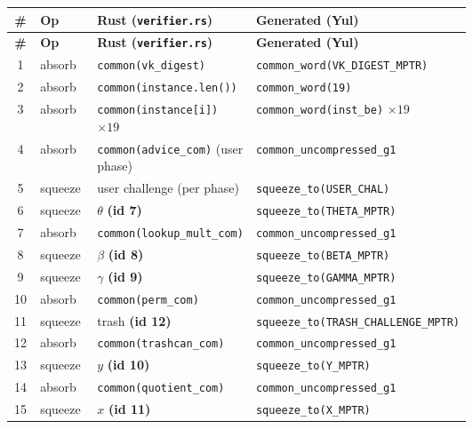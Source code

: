 \begin{small}
\begin{longtable}{@{}clp{0.30\linewidth}p{0.30\linewidth}@{}}
\toprule
\textbf{\#} & \textbf{Op} & \textbf{Rust (\texttt{verifier.rs})} & \textbf{Generated (Yul)} \\
\midrule
\endfirsthead
\toprule
\textbf{\#} & \textbf{Op} & \textbf{Rust (\texttt{verifier.rs})} & \textbf{Generated (Yul)} \\
\midrule
\endhead
1 & absorb & \texttt{common(vk\_\allowbreak{}digest)} & \texttt{common\_word\allowbreak(VK\_DIGEST\_MPTR)} \\
2 & absorb & \texttt{common(instance.len())} & \texttt{common\_word(19)} \\
3 & absorb & \texttt{common(instance[i])} $\times 19$ & \texttt{common\_\allowbreak{}word(inst\_\allowbreak{}be)} $\times 19$ \\
4 & absorb & \texttt{common(advice\_\allowbreak{}com)} (user phase) & \texttt{common\_\allowbreak{}uncompressed\_\allowbreak{}g1} \\
5 & squeeze & user challenge (per phase) & \texttt{squeeze\_\allowbreak{}to(USER\_\allowbreak{}CHAL)} \\
6 & squeeze & $\theta$ \textbf{(id 7)} & \texttt{squeeze\_\allowbreak{}to(THETA\_\allowbreak{}MPTR)} \\
7 & absorb & \texttt{common(lookup\_\allowbreak{}mult\_\allowbreak{}com)} & \texttt{common\_\allowbreak{}uncompressed\_\allowbreak{}g1} \\
8 & squeeze & $\beta$ \textbf{(id 8)} & \texttt{squeeze\_\allowbreak{}to(BETA\_\allowbreak{}MPTR)} \\
9 & squeeze & $\gamma$ \textbf{(id 9)} & \texttt{squeeze\_\allowbreak{}to(GAMMA\_\allowbreak{}MPTR)} \\
10 & absorb & \texttt{common(perm\_com)} & \texttt{common\_\allowbreak{}uncompressed\_\allowbreak{}g1} \\
11 & squeeze & trash \textbf{(id 12)} & \texttt{squeeze\_to\allowbreak(TRASH\_CHALLENGE\_MPTR)} \\
12 & absorb & \texttt{common(trashcan\_\allowbreak{}com)} & \texttt{common\_\allowbreak{}uncompressed\_\allowbreak{}g1} \\
13 & squeeze & $y$ \textbf{(id 10)} & \texttt{squeeze\_\allowbreak{}to(Y\_\allowbreak{}MPTR)} \\
14 & absorb & \texttt{common(quotient\_\allowbreak{}com)} & \texttt{common\_\allowbreak{}uncompressed\_\allowbreak{}g1} \\
15 & squeeze & $x$ \textbf{(id 11)} & \texttt{squeeze\_\allowbreak{}to(X\_\allowbreak{}MPTR)} \\

\end{longtable}
\end{small}
